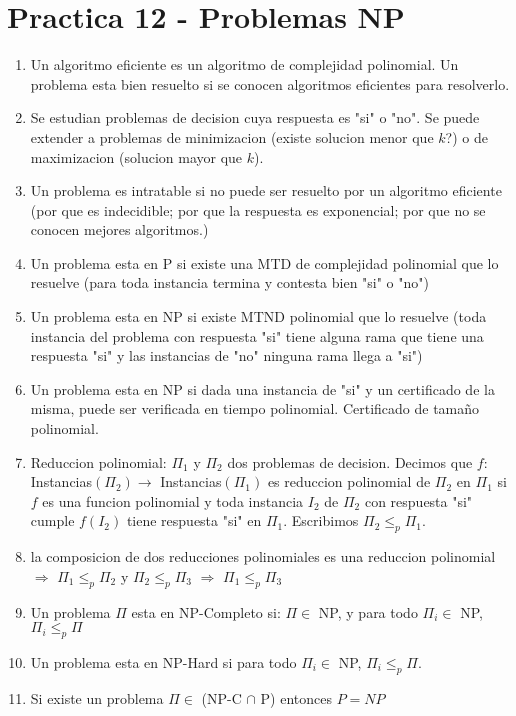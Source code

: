 \section{Practica 12 - Problemas NP}

\begin{enumerate}
\item Un algoritmo eficiente es un algoritmo de complejidad polinomial. Un problema esta bien resuelto si se conocen algoritmos eficientes para resolverlo.
\item Se estudian problemas de decision cuya respuesta es "si" o "no". Se puede extender a problemas de minimizacion (existe solucion menor que $k$?) o de maximizacion (solucion mayor que $k$).
\item Un problema es intratable si no puede ser resuelto por un algoritmo eficiente (por que es indecidible; por que la respuesta es exponencial; por que no se conocen mejores algoritmos.)
\item Un problema esta en P si existe una MTD de complejidad polinomial que lo resuelve (para toda instancia termina y contesta bien "si" o "no")
\item Un problema esta en NP si existe MTND polinomial que lo resuelve (toda instancia del problema con respuesta "si" tiene alguna rama que tiene una respuesta "si" y las instancias de "no" ninguna rama llega a "si")
\item Un problema esta en NP si dada una instancia de "si" y un certificado de la misma, puede ser verificada en tiempo polinomial. Certificado de tamaño polinomial.
\item Reduccion polinomial: $\Pi_{1}$ y $\Pi_{2}$ dos problemas de decision. Decimos que $f:$ Instancias$(\Pi_{2}) \rightarrow$ Instancias$(\Pi_{1})$ es reduccion polinomial de $\Pi_{2}$ en $\Pi_{1}$ si $f$ es una funcion polinomial y toda instancia $I_{2}$ de $\Pi_{2}$ con respuesta "si" cumple $f(I_{2})$ tiene respuesta "si" en $\Pi_{1}$. Escribimos $\Pi_{2} \leq_{p} \Pi_{1}$.
\item la composicion de dos reducciones polinomiales es una reduccion polinomial $\Rightarrow$ $\Pi_{1} \leq_{p} \Pi_{2}$ y $\Pi_{2} \leq_{p} \Pi_{3}$ $\Rightarrow$ $\Pi_{1} \leq_{p} \Pi_{3}$
\item Un problema $\Pi$ esta en NP-Completo si: $\Pi \in$ NP, y para todo $\Pi_{i} \in$ NP, $\Pi_{i} \leq_{p} \Pi$
\item Un problema esta en NP-Hard si para todo $\Pi_{i} \in$ NP, $\Pi_{i} \leq_{p} \Pi$.
\item Si existe un problema $\Pi \in$ (NP-C $\cap$ P) entonces $P=NP$

\end{enumerate}
